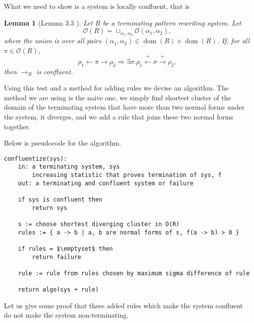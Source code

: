 \documentclass[a4paper, 11pt, english]{article}
\newtheorem{lemma}[theorem]{Lemma}
\theoremstyle{definition}
\newcommand{\Ocal}{\mathcal{O}}
\newcommand{\from}{\leftarrow}
\newcommand{\tostar}{\stackrel{*}{\to}}
\newcommand{\fromstar}{\stackrel{*}{\from}}
\DeclareMathOperator{\dom}{dom}
\begin{document}
What we need to show is a system is locally confluent, that is
\begin{lemma}[Lemma 3.3 \cite{claesson:2021}]
    Let $R$ be a terminating pattern rewriting system. Let 
    \begin{equation}
        \Ocal(R) = \cup_{\alpha_1, \alpha_2} \Ocal(\alpha_1, \alpha_2),
    \end{equation}
    where the union is over all pairs $(\alpha_1, \alpha_2) \in \dom(R) \times \dom(R)$. If, for all
    $\pi \in \Ocal(R)$,
    \begin{equation}
        \rho_1 \from \pi \to \rho_2 \Longrightarrow \exists \sigma. \rho_1 \fromstar \sigma \tostar
        \rho_2,
    \end{equation}
    then $\to_R$ is confluent.
        
\end{lemma}

Using this test and a method for adding rules we devise an algorithm. The method we are using is the
naive one, we simply find shortest cluster of the domain of the terminating system that have more than two
normal forms under the system, it diverges, and we add a rule that joins these two normal forms
together.

Below is pseudocode for the algorithm.

\lstset{basicstyle=\footnotesize\ttfamily, frame=single, breaklines=true,
mathescape=true}
\begin{minipage}{\linewidth}
\begin{lstlisting}[title={Algorithm 1}]
confluentize(sys):
    in: a terminating system, sys
        increasing statistic that proves termination of sys, f
    out: a terminating and confluent system or failure

    if sys is confluent then
        return sys

    s := choose shortest diverging cluster in O(R)
    rules := { a -> b | a, b are normal forms of s, f(a -> b) > 0 }

    if rules = $\emptyset$ then
        return failure

    rule := rule from rules chosen by maximum sigma difference of rule

    return algo(sys + rule)
\end{lstlisting}
\end{minipage}

Let us give some proof that these added rules which make the system confluent do
not make the system non-terminating.
 
\end{document}
